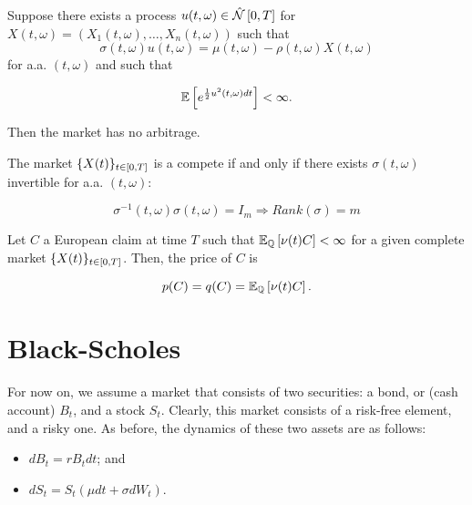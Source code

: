 \documentclass[../TGMAFFIRO.tex]{subfiles}
\begin{document}
\begin{theorem}\label{th:arbitrage_free_market}
	Suppose there exists a process $u(t,\omega) \in \hat{\mathcal{N}}\left[0, T\right]$ for $X(t,\omega) = (X_1(t,\omega), \ldots, X_n(t,\omega))$ such that
	\begin{equation}
		\sigma(t,\omega) u(t,\omega) = \mu(t, \omega) - \rho(t,\omega) X(t,\omega)
	\end{equation}
	for a.a. $(t,\omega)$ and such that
	
	\begin{equation}\label{eq:condition_arbitrage_free_market}
		\mathbb{E}\left[e^{\frac{1}{2}u^2(t,\omega) dt}\right] < \infty.
	\end{equation}
	
	Then the market has no arbitrage.
\end{theorem}

\begin{theorem}\label{th:complete_market}
	The market $\{X(t)\}_{t\in[0,T]}$ is a compete if and only if there exists $\sigma(t,\omega)$ invertible for a.a. $(t,\omega)$:
		
	\begin{equation}
		\sigma^{-1}(t,\omega) \sigma(t,\omega) = I_m \Rightarrow Rank(\sigma) = m
	\end{equation}
\end{theorem}

\begin{theorem}\label{th:european_price}
	Let $C$ a European claim at time $T$ such that $\mathbb{E}_{\mathbb{Q}}\left[\nu(t)C\right] < \infty$ for a given complete market $\{X(t)\}_{t\in[0,T]}$. Then, the price of $C$ is
	
	\begin{equation}
		p(C) = q(C) = \mathbb{E}_{\mathbb{Q}}\left[\nu(t)C\right].
	\end{equation}

\end{theorem}

\section{Black-Scholes}
For now on, we assume a market that consists of two securities: a bond, or (cash account) $B_t$, and a stock $S_t$. Clearly, this market consists of a risk-free element, and a risky one. As before, the dynamics of these two assets are as follows:
\begin{itemize}
	\item $dB_t = r B_t dt$; and
	\item $dS_t = S_t(\mu dt + \sigma dW_t)$.
\end{itemize}
\end{document}
